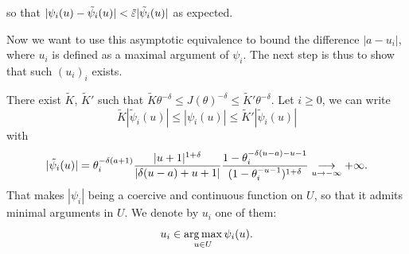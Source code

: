     so that $|\psi_i(u)-\tilde\psi_i(u)|<\tilde{\varepsilon}|\tilde\psi_i(u)|$ as expected. %

    Now we want to use this asymptotic equivalence to bound the difference $|a-u_i|$, where $u_i$ is defined as a maximal argument of $\psi_i$. The next step is thus to show that such $(u_i)_i$ exists.
    
    There exist $\tilde K$, $\tilde K'$ such that $\tilde K\theta^{-\delta}\leq J(\theta)^{-\delta}\leq \tilde K'\theta^{-\delta}$. 
    Let $i\geq0$, we can write
        \begin{equation}\label{eq:gendarmeJeffreys}
            \tilde K |\tilde\psi_i(u)| \leq|\psi_i(u)| \leq \tilde K'|\tilde\psi_i(u)|
        \end{equation}
    with 
        \begin{equation}
            |\tilde\psi_i(u)| = \theta_i^{-\delta(a+1)}\frac{|u+1|^{1+\delta}}{|\delta(u-a)+u+1|}\frac{1-\theta_i^{-\delta(u-a)-u-1}}{(1-\theta_i^{-u-1})^{1+\delta}}  \overset{\ }{\underset{u\rightarrow-\infty}{\longrightarrow}}+\infty.
        \end{equation}
    That makes $|\psi_i|$ being a coercive and continuous function on $U$, so that it admits minimal arguments in $U$. We denote by $u_i$ one of them: 
        \begin{equation}
            u_i \in \operatorname*{arg\,max}_{u\in U} \psi_i(u).
        \end{equation}

